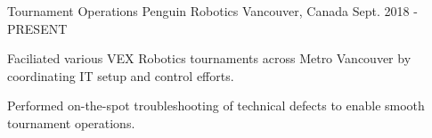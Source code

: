 

\begin{cventries}

  \cventry
    {Tournament Operations} %
    {Penguin Robotics} %
    {Vancouver, Canada} %
    {Sept. 2018 - PRESENT} %
    {
      \begin{cvitems} %
        \item {Faciliated various VEX Robotics tournaments across Metro Vancouver by coordinating IT setup and control efforts.}
        \item {Performed on-the-spot troubleshooting of technical defects to enable smooth tournament operations.}
      \end{cvitems}
    }

\end{cventries}
